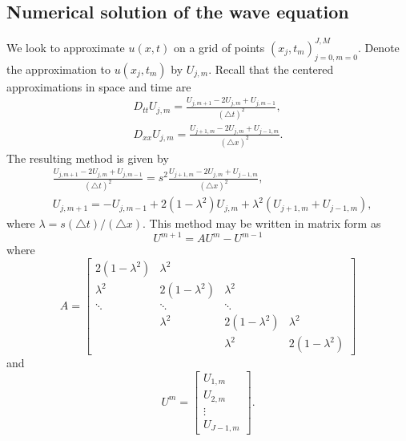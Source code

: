 \subsection{Numerical solution of the wave equation}
We look to approximate $u(x,t)$ on a grid of points $(x_j,t_m)_{j=0,m=0}^{J,M}$.
Denote the approximation to $u(x_j,t_m)$ by $U_{j,m}$.
Recall that the centered approximations in space and time are
\begin{align*}
D_{tt} U_{j,m} = \frac{U_{j,m+1} -2 U_{j,m} + U_{j,m-1}}{(\triangle t)^2} ,\\
D_{xx} U_{j,m} = \frac{U_{j+1,m} -2 U_{j,m} + U_{j-1,m}}{(\triangle x)^2} .
\end{align*}
% 
The resulting method is given by 
\begin{align*}
	&\frac{U_{j,m+1} -2 U_{j,m} + U_{j,m-1}}{(\triangle t)^2} = s^2 \frac{U_{j+1,m} -2 U_{j,m} + U_{j-1,m}}{(\triangle x)^2}, \\
	&U_{j,m+1} =  - U_{j,m-1} + 2 (1-\lambda^2) U_{j,m} + \lambda ^2 (U_{j+1,m} + U_{j-1,m}),
\end{align*}
where $ \lambda  =  s(\triangle t)/(\triangle x)$. This method may be written in matrix form as 
\[U^{m+1} = AU^{m} - U^{m-1} \]
where 
\[
A = 
\left[\begin{array}{cccc}2(1-\lambda^2) & \lambda^2 &  &  \\ \lambda^2 & 2(1-\lambda^2) & \lambda^2 &  \\ \ddots & \ddots & \ddots &  \\ & \lambda^2 & 2(1-\lambda^2) & \lambda^2 \\  &  & \lambda^2 & 2(1-\lambda^2)\end{array}\right]
\]
and
\[ U^m = 
\left[\begin{array}{c}U_{1,m} \\U_{2,m} \\\vdots \\U_{J-1,m}\end{array}\right].
\]


